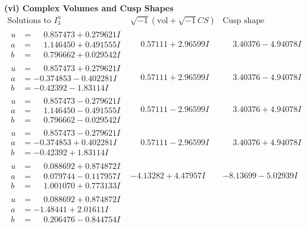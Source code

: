 \documentclass[1p]{elsarticle_modified}
\theoremstyle{definition}
\newcommand{\I}{\sqrt{-1}}
\begin{document}
\newpage\flushleft \textbf{(vi) Complex Volumes and Cusp Shapes}
$$\begin{array}{c|c|c}  
\text{Solutions to }I^u_{3}& \I (\text{vol} + \sqrt{-1}CS) & \text{Cusp shape}\\
 \hline 
\begin{aligned}
u &= \phantom{-}0.857473 + 0.279621 I \\
a &= \phantom{-}1.146450 + 0.491555 I \\
b &= \phantom{-}0.796662 + 0.029542 I\end{aligned}
 & \phantom{-}0.57111 + 2.96599 I & \phantom{-}3.40376 - 4.94078 I \\ \hline\begin{aligned}
u &= \phantom{-}0.857473 + 0.279621 I \\
a &= -0.374853 - 0.402281 I \\
b &= -0.42392 - 1.83114 I\end{aligned}
 & \phantom{-}0.57111 + 2.96599 I & \phantom{-}3.40376 - 4.94078 I \\ \hline\begin{aligned}
u &= \phantom{-}0.857473 - 0.279621 I \\
a &= \phantom{-}1.146450 - 0.491555 I \\
b &= \phantom{-}0.796662 - 0.029542 I\end{aligned}
 & \phantom{-}0.57111 - 2.96599 I & \phantom{-}3.40376 + 4.94078 I \\ \hline\begin{aligned}
u &= \phantom{-}0.857473 - 0.279621 I \\
a &= -0.374853 + 0.402281 I \\
b &= -0.42392 + 1.83114 I\end{aligned}
 & \phantom{-}0.57111 - 2.96599 I & \phantom{-}3.40376 + 4.94078 I \\ \hline\begin{aligned}
u &= \phantom{-}0.088692 + 0.874872 I \\
a &= \phantom{-}0.079744 - 0.117957 I \\
b &= \phantom{-}1.001070 + 0.773133 I\end{aligned}
 & -4.13282 + 4.47957 I & -8.13699 - 5.02939 I \\ \hline\begin{aligned}
u &= \phantom{-}0.088692 + 0.874872 I \\
a &= -1.48441 + 2.01611 I \\
b &= \phantom{-}0.206476 - 0.844754 I\end{aligned}

\end{array}$$
\end{document}
